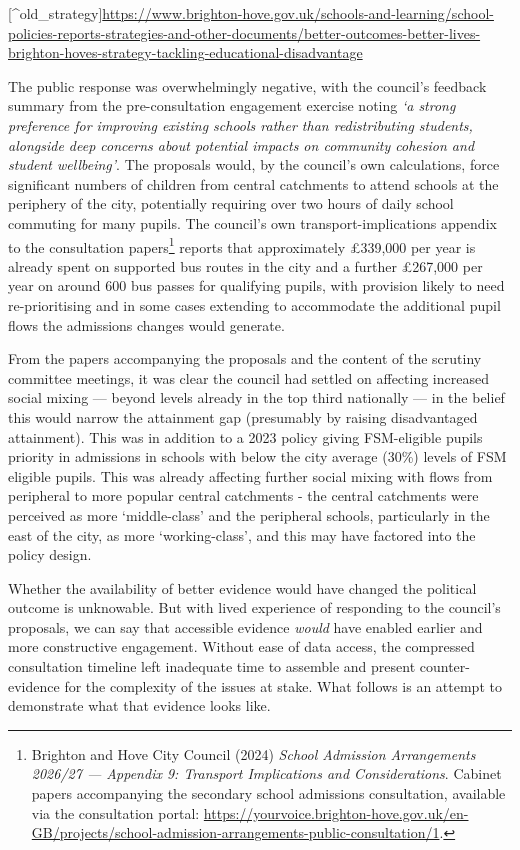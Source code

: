 \documentclass[
  12pt,
  titlepage]{article}
\begin{document}
{[}\^{}old\_strategy{]}\url{https://www.brighton-hove.gov.uk/schools-and-learning/school-policies-reports-strategies-and-other-documents/better-outcomes-better-lives-brighton-hoves-strategy-tackling-educational-disadvantage}

The public response was overwhelmingly negative, with the council's
feedback summary from the pre-consultation engagement exercise noting
\emph{`a strong preference for improving existing schools rather than
redistributing students, alongside deep concerns about potential impacts
on community cohesion and student wellbeing'}. The proposals would, by
the council's own calculations, force significant numbers of children
from central catchments to attend schools at the periphery of the city,
potentially requiring over two hours of daily school commuting for many
pupils. The council's own transport-implications appendix to the
consultation papers\footnote{Brighton and Hove City Council (2024)
  \emph{School Admission Arrangements 2026/27 --- Appendix 9: Transport
  Implications and Considerations}. Cabinet papers accompanying the
  secondary school admissions consultation, available via the
  consultation portal:
  \url{https://yourvoice.brighton-hove.gov.uk/en-GB/projects/school-admission-arrangements-public-consultation/1}.}
reports that approximately £339,000 per year is already spent on
supported bus routes in the city and a further £267,000 per year on
around 600 bus passes for qualifying pupils, with provision likely to
need re-prioritising and in some cases extending to accommodate the
additional pupil flows the admissions changes would generate.

From the papers accompanying the proposals and the content of the
scrutiny committee meetings, it was clear the council had settled on
affecting increased social mixing --- beyond levels already in the top
third nationally --- in the belief this would narrow the attainment gap
(presumably by raising disadvantaged attainment). This was in addition
to a 2023 policy giving FSM-eligible pupils priority in admissions in
schools with below the city average (30\%) levels of FSM eligible
pupils. This was already affecting further social mixing with flows from
peripheral to more popular central catchments - the central catchments
were perceived as more `middle-class' and the peripheral schools,
particularly in the east of the city, as more `working-class', and this
may have factored into the policy design.

Whether the availability of better evidence would have changed the
political outcome is unknowable. But with lived experience of responding
to the council's proposals, we can say that accessible evidence
\emph{would} have enabled earlier and more constructive engagement.
Without ease of data access, the compressed consultation timeline left
inadequate time to assemble and present counter-evidence for the
complexity of the issues at stake. What follows is an attempt to
demonstrate what that evidence looks like.
\end{document}
